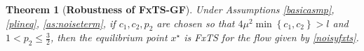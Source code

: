 \documentclass[letterpaper]{article}
\newtheorem{assumption}{Assumption}
\newtheorem{theorem}{Theorem}
\newtheorem{remark}{Remark}
\begin{document}





\begin{theorem}[\textbf{Robustness of FxTS-GF}]\label{thm:Robustness}
Under Assumptions \ref{basicasmp}, \ref{plineq}, \ref{as:noiseterm}, if $c_1, c_2, p_2$ are chosen so that
$4\mu^2 \min \left\{c_1, c_2 \right\}>l$ and $1<p_2\leq \frac{3}{2}$,
then the equilibrium point $x^\star$ is FxTS for the flow given by \eqref{noisyfxts}.
\end{theorem}
\end{document}
